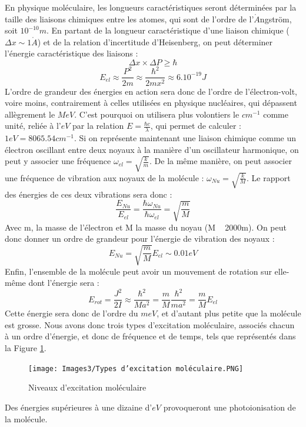  En physique moléculaire, les longueurs caractéristiques seront déterminées par la taille des liaisons chimiques entre les atomes, qui sont de l'ordre de l'$\mathring{A}$ngström, soit $10^{-10}m$.\newline
 En partant de la longueur caractéristique d'une liaison chimique ($\Delta x \sim 1\mathring{A}$) et de la relation d'incertitude d'Heisenberg, on peut déterminer l'énergie caractéristique des liaisons : 
 \begin{equation*}
     \Delta x\times \Delta P \geq \hbar
 \end{equation*}
 \begin{equation*}
     E_{el} \approx \frac{P^2}{2m} \approx \frac{\hbar ^2}{2mx^2} \approx 6.10^{-19}J
 \end{equation*}
  L'ordre de grandeur des énergies en action sera donc de l'ordre de l'électron-volt, voire moins, contrairement à celles utilisées en physique nucléaires, qui dépassent allègrement le $MeV$. C'est pourquoi on utilisera plus volontiers le $cm^{-1}$ comme unité, reliée à l'$eV$ par la relation $E = \frac{\hbar c}{\lambda}$, qui permet de calculer : $1eV = 8065.54 cm^{-1}$.\newline
  Si on représente maintenant une liaison chimique comme un électron oscillant entre deux noyaux à la manière d'un oscillateur harmonique, on peut y associer une fréquence $\omega_{el} = \sqrt{\frac{k}{m}}$.\newline
  De la même manière, on peut associer une fréquence de vibration aux noyaux de la molécule : $\omega_{Nu} = \sqrt{\frac{k}{M}}$.\newline
  Le rapport des énergies de ces deux vibrations sera donc : 
  \begin{equation*}
      \frac{E_{Nu}}{E_{el}} = \frac{\hbar \omega_{Nu}}{\hbar\omega_{el}} = \sqrt{\frac{m}{M}}
  \end{equation*}
  Avec m, la masse de l'électron et M la masse du noyau (M ~ 2000m). On peut donc donner un ordre de grandeur pour l'énergie de vibration des noyaux : 
  \begin{equation*}
      E_{Nu} = \sqrt{\frac{m}{M}}E_{el} \sim 0.01 eV
  \end{equation*}
  Enfin, l'ensemble de la molécule peut avoir un mouvement de rotation sur elle-même dont l'énergie sera : 
  \begin{equation*}
      E_{rot} = \frac{J^2}{2I} \approx \frac{\hbar^2}{Ma^2} = \frac{m}{M}\frac{\hbar^2}{ma^2} = \frac{m}{M}E_{el}
  \end{equation*}
 Cette énergie sera donc de l'ordre du $meV$, et d'autant plus petite que la molécule est grosse.\newline
 Nous avons donc trois types d'excitation moléculaire, associés chacun à un ordre d'énergie, et donc de fréquence et de temps, tels que représentés dans la Figure \ref{fig:niv_excitation_mol}.\newline
 \begin{figure}[ht]
    \centering
    \texttt{[image: Images3/Types d'excitation moléculaire.PNG]}
    \caption{Niveaux d'excitation moléculaire}
    \label{fig:niv_excitation_mol}
\end{figure}
Des énergies supérieures à une dizaine d'$eV$ provoqueront une photoionisation de la molécule.

